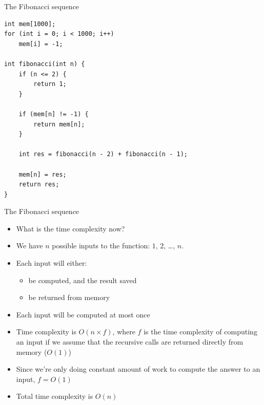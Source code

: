 \documentclass{beamer}
\begin{document}
\begin{frame}{The Fibonacci sequence}
    \vspace{5pt}

    \begin{verbatim}
int mem[1000];
for (int i = 0; i < 1000; i++)
    mem[i] = -1;

int fibonacci(int n) {
    if (n <= 2) {
        return 1;
    }

    if (mem[n] != -1) {
        return mem[n];
    }

    int res = fibonacci(n - 2) + fibonacci(n - 1);

    mem[n] = res;
    return res;
}
    \end{verbatim}

\end{frame}

\begin{frame}[plain]{The Fibonacci sequence}
    \begin{itemize}
        \item What is the time complexity now?
        \vspace{5pt}
        \item We have $n$ possible inputs to the function: $1$, $2$, \ldots, $n$.
        \item Each input will either:
            \begin{itemize}
                \item be computed, and the result saved
                \item be returned from memory
            \end{itemize}
        \item Each input will be computed at most once
        \item Time complexity is $O(n \times f)$, where $f$ is the time complexity of computing an input if we assume that the recursive calls are returned directly from memory ($O(1)$)
        \item Since we're only doing constant amount of work to compute the answer to an input, $f = O(1)$
        \item Total time complexity is $O(n)$
    \end{itemize}
\end{frame}
\end{document}
